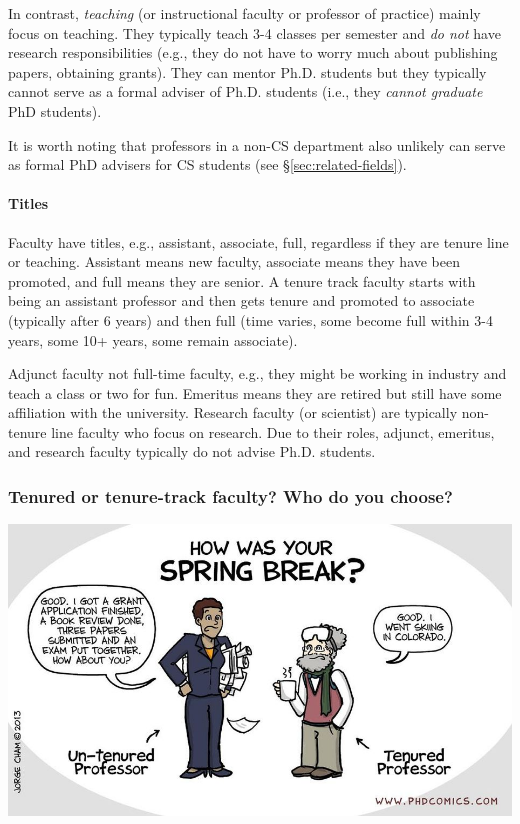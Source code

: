 \documentclass[11pt]{article}
\begin{document}
In contrast, \emph{teaching} (or instructional faculty or professor of practice) mainly focus on teaching. They typically teach 3-4 classes per semester and \emph{do not} have research responsibilities (e.g., they do not have to worry much about publishing papers, obtaining grants).  They can mentor Ph.D. students but they typically cannot serve as a formal adviser of Ph.D. students (i.e., they \emph{cannot graduate} PhD students).  

It is worth noting that professors in a non-CS department also unlikely can serve as formal PhD advisers for CS students (see \S\ref{sec:related-fields}).

\paragraph{Titles} Faculty have titles, e.g., assistant, associate, full, regardless if they are tenure line or teaching.  Assistant means new faculty, associate means they have been promoted, and full means they are senior. A tenure track faculty starts with being an assistant professor and then gets tenure and promoted to associate (typically after 6 years) and then full (time varies, some become full within 3-4 years, some 10+ years, some remain associate). 

Adjunct faculty not full-time faculty, e.g., they might be working in industry and teach a class or two for fun.  Emeritus means they are retired but still have some affiliation with the university.  Research faculty (or scientist) are typically non-tenure line faculty who focus on research.  Due to their roles, adjunct, emeritus, and research faculty typically do not advise Ph.D. students.

\subsubsection{Tenured or tenure-track faculty? Who do you choose?}\label{sec:tenure-vs-tenure-track}

      \begin{center}
        \includegraphics[scale=0.4]{c8.png}
      \end{center}
\end{document}

